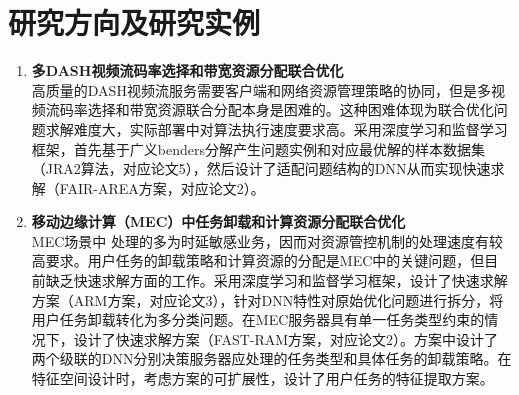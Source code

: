 \documentclass{resume}
\begin{document}
\section{\faCogs 研究方向及研究实例}
\begin{enumerate}
  \item \textbf{多DASH视频流码率选择和带宽资源分配联合优化}
  \\ 高质量的DASH视频流服务需要客户端和网络资源管理策略的协同，但是多视频流码率选择和带宽资源联合分配本身是困难的。这种困难体现为联合优化问题求解难度大，实际部署中对算法执行速度要求高。采用深度学习和监督学习框架，首先基于广义benders分解产生问题实例和对应最优解的样本数据集（JRA2算法，对应论文5），然后设计了适配问题结构的DNN从而实现快速求解（FAIR-AREA方案，对应论文2）。
  \item \textbf{移动边缘计算（MEC）中任务卸载和计算资源分配联合优化}
  \\ MEC场景中 处理的多为时延敏感业务，因而对资源管控机制的处理速度有较高要求。用户任务的卸载策略和计算资源的分配是MEC中的关键问题，但目前缺乏快速求解方面的工作。采用深度学习和监督学习框架，设计了快速求解方案（ARM方案，对应论文3），针对DNN特性对原始优化问题进行拆分，将用户任务卸载转化为多分类问题。在MEC服务器具有单一任务类型约束的情况下，设计了快速求解方案（FAST-RAM方案，对应论文2）。方案中设计了两个级联的DNN分别决策服务器应处理的任务类型和具体任务的卸载策略。在特征空间设计时，考虑方案的可扩展性，设计了用户任务的特征提取方案。
\end{enumerate}
\end{document}
